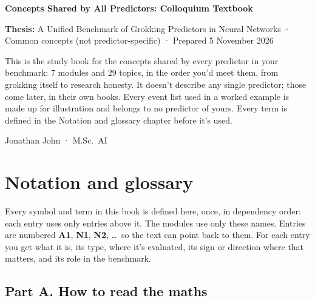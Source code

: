 \documentclass[11pt,a4paper,oneside,openany]{report}
\newcommand{\gl}[1]{\textbf{#1}}   %
\begin{document}
\begin{titlepage}
\raggedright
{\LARGE\bfseries Concepts Shared by All Predictors: Colloquium Textbook\par}
\vspace{6pt}
\textbf{Thesis:} A Unified Benchmark of Grokking Predictors in Neural Networks · Common concepts (not predictor-specific) · Prepared 5 November 2026
\vspace{14pt}

This is the study book for the concepts shared by every predictor in your benchmark: 7 modules and 29 topics, in the order you'd meet them, from grokking itself to research honesty. It doesn't describe any single predictor; those come later, in their own books. Every event list used in a worked example is made up for illustration and belongs to no predictor of yours. Every term is defined in the Notation and glossary chapter before it's used.

\vspace{10pt}
Jonathan John · M.Sc.\ AI

\end{titlepage}

\tableofcontents
\clearpage
\chapter*{Notation and glossary}

Every symbol and term in this book is defined here, once, in dependency order: each entry uses only entries above it. The modules use only these names. Entries are numbered \gl{A1}, \gl{N1}, \gl{N2}, \ldots\ so the text can point back to them. For each entry you get what it is, its type, where it's evaluated, its sign or direction where that matters, and its role in the benchmark.

\section*{Part A. How to read the maths}
\end{document}
